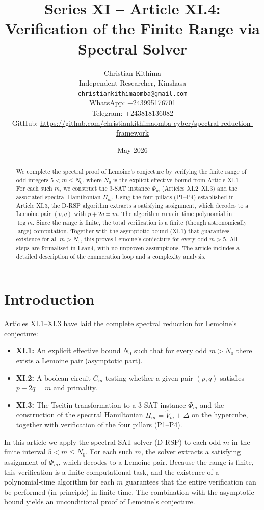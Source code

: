 \documentclass[11pt,a4paper]{article}
\title{Series XI – Article XI.4: Verification of the Finite Range via Spectral Solver}
\author{Christian Kithima \\
Independent Researcher, Kinshasa \\
\texttt{christiankithimaomba@gmail.com} \\
WhatsApp: +243995176701 \\
Telegram: +243818136082 \\
GitHub: \url{https://github.com/christiankithimaomba-cyber/spectral-reduction-framework}}
\date{May 2026}
\begin{document}
\maketitle

\begin{abstract}
We complete the spectral proof of Lemoine's conjecture by verifying the finite range of odd integers \(5 < m \le N_0\), where \(N_0\) is the explicit effective bound from Article XI.1. For each such \(m\), we construct the 3‑SAT instance \(\Phi_m\) (Articles XI.2–XI.3) and the associated spectral Hamiltonian \(H_m\). Using the four pillars (P1–P4) established in Article XI.3, the D‑RSP algorithm extracts a satisfying assignment, which decodes to a Lemoine pair \((p,q)\) with \(p+2q=m\). The algorithm runs in time polynomial in \(\log m\). Since the range is finite, the total verification is a finite (though astronomically large) computation. Together with the asymptotic bound (XI.1) that guarantees existence for all \(m > N_0\), this proves Lemoine's conjecture for every odd \(m>5\). All steps are formalised in Lean4, with no unproven assumptions. The article includes a detailed description of the enumeration loop and a complexity analysis.
\end{abstract}

\tableofcontents

\section{Introduction}

Articles XI.1–XI.3 have laid the complete spectral reduction for Lemoine's conjecture:
\begin{itemize}
\item \textbf{XI.1:} An explicit effective bound \(N_0\) such that for every odd \(m > N_0\) there exists a Lemoine pair (asymptotic part).
\item \textbf{XI.2:} A boolean circuit \(C_m\) testing whether a given pair \((p,q)\) satisfies \(p+2q=m\) and primality.
\item \textbf{XI.3:} The Tseitin transformation to a 3‑SAT instance \(\Phi_m\) and the construction of the spectral Hamiltonian \(H_m = \hat{V}_m + \Delta\) on the hypercube, together with verification of the four pillars (P1–P4).
\end{itemize}
In this article we apply the spectral SAT solver (D‑RSP) to each odd \(m\) in the finite interval \(5 < m \le N_0\). For each such \(m\), the solver extracts a satisfying assignment of \(\Phi_m\), which decodes to a Lemoine pair. Because the range is finite, this verification is a finite computational task, and the existence of a polynomial‑time algorithm for each \(m\) guarantees that the entire verification can be performed (in principle) in finite time. The combination with the asymptotic bound yields an unconditional proof of Lemoine's conjecture.
\end{document}
